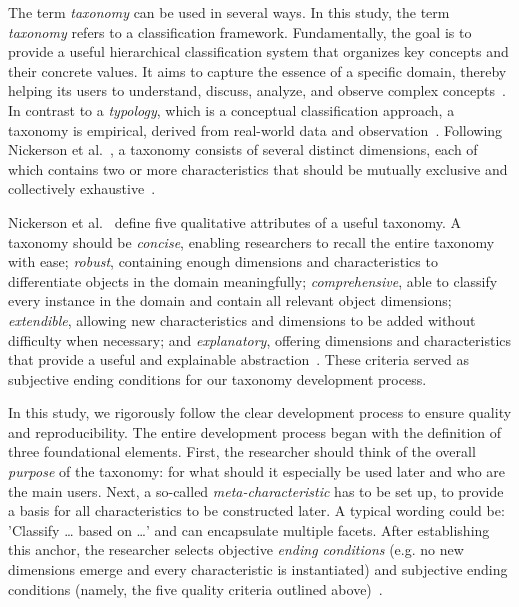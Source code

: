 \documentclass[pdflatex,sn-mathphys-num]{sn-jnl}%
\theoremstyle{thmstyleone}%
\theoremstyle{thmstyletwo}%
\theoremstyle{thmstylethree}%
\begin{document}
The term \textit{taxonomy} can be used in several ways. 
In this study, the term \textit{taxonomy} refers to a classification framework. Fundamentally, the goal is to provide a useful hierarchical classification system that organizes key concepts and their concrete values. It aims to capture the essence of a specific domain, thereby helping its users to understand, discuss, analyze, and observe complex concepts~\cite{nickerson2013method,oberlander2019taxonomy}. 
In contrast to a \textit{typology}, which is a conceptual classification approach, a taxonomy is empirical, derived from real-world data and observation~\cite{bailey1994typologies}. Following Nickerson et al.~\cite{nickerson2013method}, a taxonomy consists of several distinct dimensions, each of which contains two or more characteristics that should be mutually exclusive and collectively exhaustive~\cite{nickerson2013method,oberlander2019taxonomy}.

Nickerson et al.~\cite{nickerson2013method} define five qualitative attributes of a useful taxonomy.
A taxonomy should be 
\textit{concise}, enabling researchers to recall the entire taxonomy with ease; 
\textit{robust}, containing enough dimensions and characteristics to differentiate objects in the domain meaningfully; 
\textit{comprehensive}, able to classify every instance in the domain and contain all relevant object dimensions; 
\textit{extendible}, allowing new characteristics and dimensions to be added without difficulty when necessary; and 
\textit{explanatory}, offering dimensions and characteristics that provide a useful and explainable abstraction~\cite{nickerson2013method}.
These criteria served as subjective ending conditions for our taxonomy development process. 

In this study, we rigorously follow the clear development process to ensure quality and reproducibility. 
The entire development process began with the definition of three foundational elements. 
First, the researcher should think of the overall \textit{purpose} of the taxonomy: for what should it especially be used later and who are the main users. 
Next, a so-called \textit{meta-characteristic} has to be set up, to provide a basis for all characteristics to be constructed later. 
A typical wording could be: 'Classify … based on …' and can encapsulate multiple facets. 
After establishing this anchor, the researcher selects objective \textit{ending conditions} (e.g. no new dimensions emerge and every characteristic is instantiated) and subjective ending conditions (namely, the five quality criteria outlined above)~\cite{nickerson2013method}. 
\end{document}
